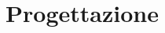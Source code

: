 \documentclass{llncs}
\newcommand{\version}{7}
\newcommand{\labelsec}[1]{\label{sec:#1}}
\begin{document}

\section{Progettazione}
\labelsec{Project}

\end{document}
